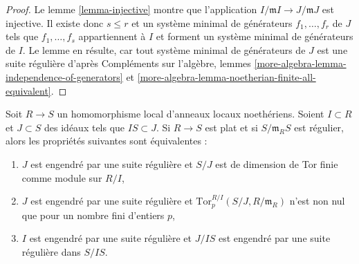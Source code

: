 \begin{proof}
Le lemme \ref{lemma-injective} montre que l'application
$I/\mathfrak m I \to J/\mathfrak m J$
est injective. Il existe donc $s \leq r$ et un système minimal
de générateurs $f_1, \ldots, f_r$ de $J$ tels que
$f_1, \ldots, f_s$ appartiennent à $I$
et forment un système minimal de générateurs de $I$.
Le lemme en résulte, car tout système minimal de générateurs de $J$
est une suite régulière d'après
Compléments sur l'algèbre, lemmes
\ref{more-algebra-lemma-independence-of-generators} et
\ref{more-algebra-lemma-noetherian-finite-all-equivalent}.
\end{proof}

\begin{lemma}
\label{lemma-perfect-map-ci}
Soit $R \to S$ un homomorphisme local d'anneaux locaux noethériens.
Soient $I \subset R$ et $J \subset S$ des idéaux tels que
$IS \subset J$. Si $R \to S$ est plat et si $S/\mathfrak m_RS$ est
régulier, alors les propriétés suivantes sont équivalentes :
\begin{enumerate}
\item $J$ est engendré par une suite régulière et
$S/J$ est de dimension de Tor finie comme module sur $R/I$,
\item $J$ est engendré par une suite régulière et
$\text{Tor}^{R/I}_p(S/J, R/\mathfrak m_R)$ n'est non nul
que pour un nombre fini d'entiers $p$,
\item $I$ est engendré par une suite régulière
et $J/IS$ est engendré par une suite régulière dans $S/IS$.
\end{enumerate}
\end{lemma}

